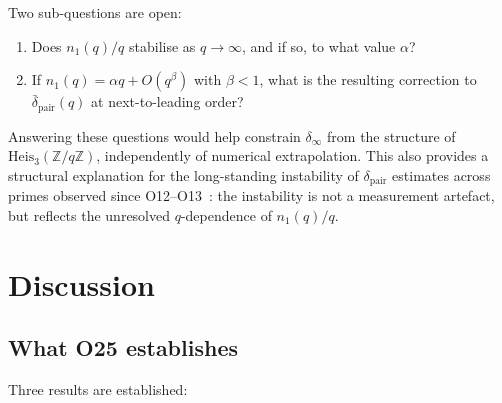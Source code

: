 \documentclass[11pt,a4paper]{article}
\theoremstyle{definition}
\newcommand{\dpair}{\delta_{\mathrm{pair}}}
\newcommand{\dpairmean}{\bar{\delta}_{\mathrm{pair}}}
\newcommand{\Heis}{\mathrm{Heis}_3(\mathbb{Z}/q\mathbb{Z})}
\begin{document}
    Two sub-questions are open:
    \begin{enumerate}
      \item Does $n_1(q)/q$ stabilise as $q \to \infty$, and if so, to what value $\alpha$?
      \item If $n_1(q) = \alpha q + O(q^\beta)$ with $\beta < 1$, what is the resulting
      correction to $\dpairmean(q)$ at next-to-leading order?
    \end{enumerate}
    Answering these questions would help constrain $\delta_\infty$
    from the structure of $\Heis$, independently of numerical extrapolation.
    This also provides a structural explanation for the long-standing instability of
    $\dpair$ estimates across primes observed since O12--O13~\cite{Beau2026a16,Beau2026a17}:
    the instability is not a measurement artefact, but reflects the unresolved
    $q$-dependence of $n_1(q)/q$.

  \section{Discussion}

    \subsection{What O25 establishes}

      Three results are established:
\end{document}
